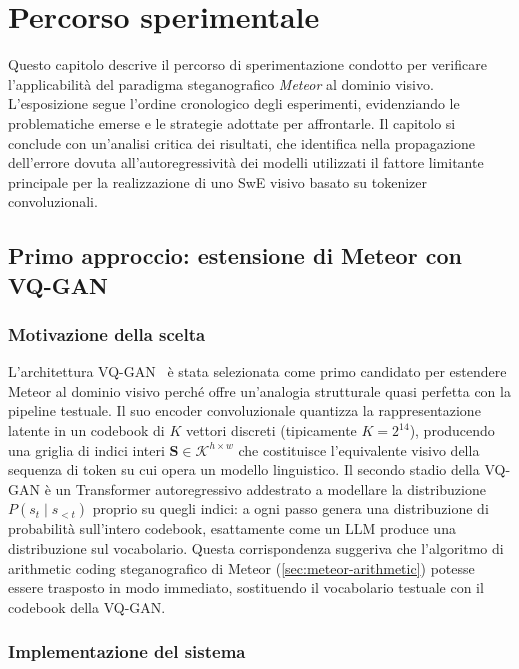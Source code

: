 
\chapter{Percorso sperimentale}\label{ch:sperimentazione}

Questo capitolo descrive il percorso di sperimentazione condotto per verificare l'applicabilità del paradigma steganografico \emph{Meteor} al dominio visivo. L'esposizione segue l'ordine cronologico degli esperimenti, evidenziando le problematiche emerse e le strategie adottate per affrontarle. Il capitolo si conclude con un'analisi critica dei risultati, che identifica nella propagazione dell'errore dovuta all'autoregressività dei modelli utilizzati il fattore limitante principale per la realizzazione di uno SwE visivo basato su tokenizer convoluzionali.

\section{Primo approccio: estensione di Meteor con VQ-GAN}

\subsection{Motivazione della scelta}

L'architettura VQ-GAN~\cite{esser-2020} è stata selezionata come primo candidato per estendere Meteor al dominio visivo perché offre un'analogia strutturale quasi perfetta con la pipeline testuale. Il suo encoder convoluzionale quantizza la rappresentazione latente in un codebook di $K$ vettori discreti (tipicamente $K = 2^{14}$), producendo una griglia di indici interi $\mathbf{S} \in \mathcal{K}^{h \times w}$ che costituisce l'equivalente visivo della sequenza di token su cui opera un modello linguistico. Il secondo stadio della VQ-GAN è un Transformer autoregressivo addestrato a modellare la distribuzione $P(s_t \mid s_{<t})$ proprio su quegli indici: a ogni passo genera una distribuzione di probabilità sull'intero codebook, esattamente come un LLM produce una distribuzione sul vocabolario. Questa corrispondenza suggeriva che l'algoritmo di arithmetic coding steganografico di Meteor (\autoref{sec:meteor-arithmetic}) potesse essere trasposto in modo immediato, sostituendo il vocabolario testuale con il codebook della VQ-GAN.

\subsection{Implementazione del sistema}

